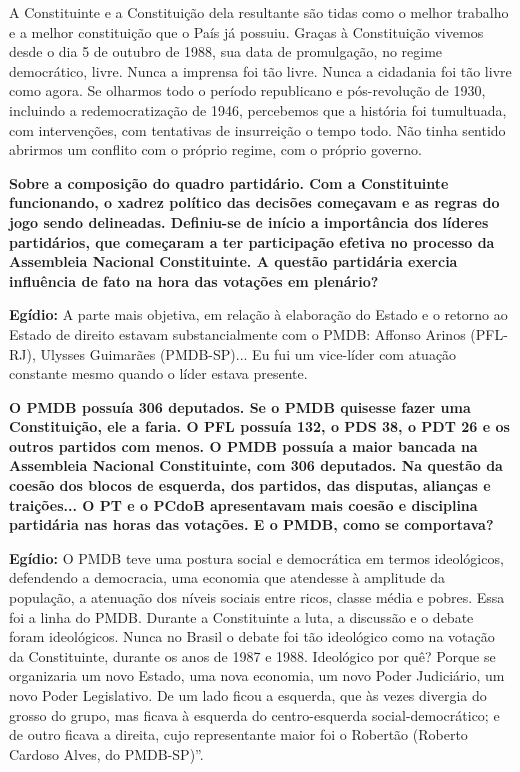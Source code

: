 A Constituinte e a Constituição dela resultante são tidas como o melhor
trabalho e a melhor constituição que o País já possuiu. Graças à
Constituição vivemos desde o dia 5 de outubro de 1988, sua data de
promulgação, no regime democrático, livre. Nunca a imprensa foi tão
livre. Nunca a cidadania foi tão livre como agora. Se olharmos todo o
período republicano e pós-revolução de 1930, incluindo a
redemocratização de 1946, percebemos que a história foi tumultuada, com
intervenções, com tentativas de insurreição o tempo todo. Não tinha
sentido abrirmos um conflito com o próprio regime, com o próprio
governo.

\textbf{Sobre a composição do quadro partidário. Com a Constituinte
funcionando, o xadrez político das decisões começavam e as regras do
jogo sendo delineadas. Definiu-se de início a importância dos líderes
partidários, que começaram a ter participação efetiva no processo da
Assembleia Nacional Constituinte. A questão partidária exercia
influência de fato na hora das votações em plenário?}

\textbf{Egídio:} A parte mais objetiva, em relação à elaboração do
Estado e o retorno ao Estado de direito estavam substancialmente com o
PMDB: Affonso Arinos (PFL-RJ), Ulysses Guimarães (PMDB-SP)... Eu fui um
vice-líder com atuação constante mesmo quando o líder estava presente.

\textbf{O PMDB possuía 306 deputados. Se o PMDB quisesse fazer uma
Constituição, ele a faria. O PFL possuía 132, o PDS 38, o PDT 26 e os
outros partidos com menos. O PMDB possuía a maior bancada na Assembleia
Nacional Constituinte, com 306 deputados. Na questão da coesão dos
blocos de esquerda, dos partidos, das disputas, alianças e traições... O
PT e o PCdoB apresentavam mais coesão e disciplina partidária nas horas
das votações. E o PMDB, como se comportava?}

\textbf{Egídio:} O PMDB teve uma postura social e democrática em termos
ideológicos, defendendo a democracia, uma economia que atendesse à
amplitude da população, a atenuação dos níveis sociais entre ricos,
classe média e pobres. Essa foi a linha do PMDB. Durante a Constituinte
a luta, a discussão e o debate foram ideológicos. Nunca no Brasil o
debate foi tão ideológico como na votação da Constituinte, durante os
anos de 1987 e 1988. Ideológico por quê? Porque se organizaria um novo
Estado, uma nova economia, um novo Poder Judiciário, um novo Poder
Legislativo. De um lado ficou a esquerda, que às vezes divergia do
grosso do grupo, mas ficava à esquerda do centro-esquerda
social-democrático; e de outro ficava a direita, cujo representante
maior foi o Robertão (Roberto Cardoso Alves, do PMDB-SP)''.

